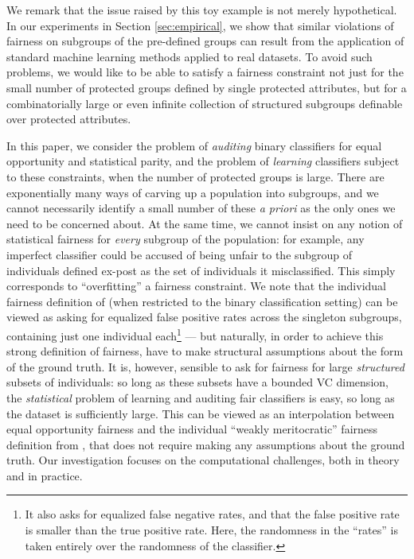 We remark that the issue raised by this toy example is not merely hypothetical.
In our experiments in Section \ref{sec:empirical}, we show that similar violations of fairness on
subgroups of the pre-defined groups can result from the application of standard machine learning
methods applied to real datasets.
To avoid such problems, we would like to be able to satisfy a fairness constraint not just for
the small number of protected groups defined by single protected attributes, but for a combinatorially large or even infinite
collection of structured subgroups definable over protected attributes.


In this paper, we consider the problem of {\em auditing\/} binary classifiers for equal opportunity and statistical parity,
and the problem of {\em learning\/}  classifiers subject to these constraints,
when the number of protected groups is large.
There are exponentially many ways of carving up a population into subgroups, and we cannot necessarily identify a small number of these \emph{a priori}
as the only ones we need to be concerned about. At the same time, we cannot insist on any notion of statistical fairness for \emph{every} subgroup of the population: for example, any imperfect classifier could be accused of being unfair to the subgroup of individuals defined ex-post as the set of individuals it misclassified. This simply corresponds to ``overfitting'' a fairness constraint. We note that the individual fairness definition of \cite{JKMR16} (when restricted to the binary classification setting) can be viewed as asking for equalized false positive rates across the singleton subgroups, containing just one individual each\footnote{It also asks for equalized false negative rates, and that the false positive rate is smaller than the true positive rate. Here, the randomness in the ``rates'' is taken entirely over the randomness of the classifier.} --- but naturally, in order to achieve this strong definition of fairness, \cite{JKMR16} have to make structural assumptions about the form of the ground truth. It is, however, sensible to ask for fairness for large \emph{structured} subsets of individuals: so long as these subsets have a bounded VC dimension, the \emph{statistical} problem of learning and auditing fair classifiers is easy, so long as the dataset is sufficiently large. This can be viewed as an interpolation between equal opportunity fairness and the individual ``weakly meritocratic'' fairness definition from \cite{JKMR16}, that does not require making any assumptions about the ground truth.
Our investigation focuses on the computational challenges, both in theory and in practice.

